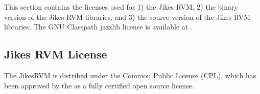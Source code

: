 This section contains the licenses used for 1) the Jikes\trademark
RVM, 2) the binary 
version of the Jikes RVM libraries, and 3) the source version of the
Jikes RVM libraries.  The GNU Classpath jazzlib license is available
at \xlink{{\tt \classpathURL}}{\classpathURL}.  



\subsection{Jikes RVM License}
The Jikes\trademark RVM is distribed under the Common Public License (CPL),
which has been approved by the 
as a fully certified open source license.



